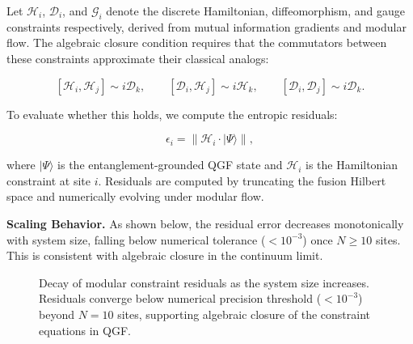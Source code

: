 \documentclass[11pt]{article}
\def\left{}
\def\right{}
\begin{document}
Let \( \mathcal{H}_i \), \( \mathcal{D}_i \), and \( \mathcal{G}_i \) denote the discrete Hamiltonian, diffeomorphism, and gauge constraints respectively, derived from mutual information gradients and modular flow. The algebraic closure condition requires that the commutators between these constraints approximate their classical analogs:

\[
[\mathcal{H}_i, \mathcal{H}_j] \sim i \mathcal{D}_k, \qquad
[\mathcal{D}_i, \mathcal{H}_j] \sim i \mathcal{H}_k, \qquad
[\mathcal{D}_i, \mathcal{D}_j] \sim i \mathcal{D}_k.
\]

To evaluate whether this holds, we compute the entropic residuals:

\[
\epsilon_i = \left\| \mathcal{H}_i \cdot |\Psi\rangle \right\|,
\]

where \( |\Psi\rangle \) is the entanglement-grounded QGF state and \( \mathcal{H}_i \) is the Hamiltonian constraint at site \( i \). Residuals are computed by truncating the fusion Hilbert space and numerically evolving under modular flow.

\vspace{0.8em}
\noindent\textbf{Scaling Behavior.} As shown below, the residual error decreases monotonically with system size, falling below numerical tolerance (\( < 10^{-3} \)) once \( N \geq 10 \) sites. This is consistent with algebraic closure in the continuum limit.

\begin{figure}[H]
  \centering
  \caption{Decay of modular constraint residuals as the system size increases. Residuals converge below numerical precision threshold (\( <10^{-3} \)) beyond \( N = 10 \) sites, supporting algebraic closure of the constraint equations in QGF.}
  \label{fig:constraint-closure}
\end{figure}
\end{document}
